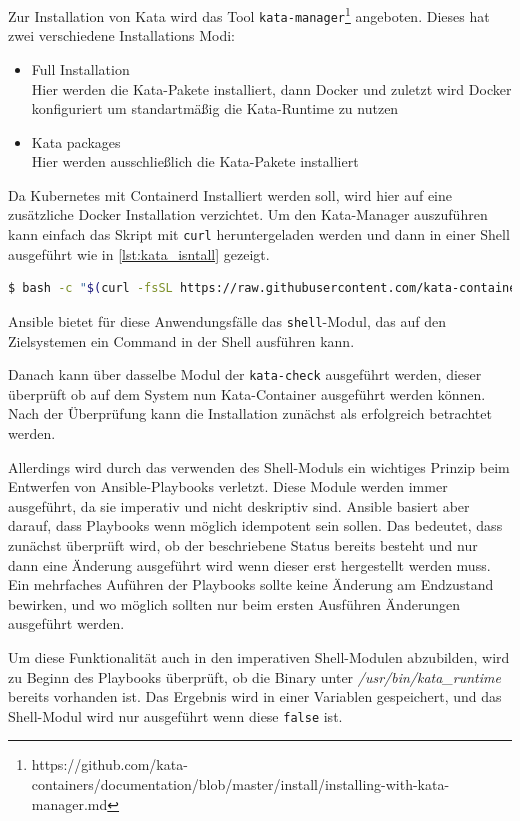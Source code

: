 Zur Installation von Kata wird das Tool \texttt{kata-manager}\footnote{https://github.com/kata-containers/documentation/blob/master/install/installing-with-kata-manager.md} angeboten. 
Dieses hat zwei verschiedene Installations Modi:
\begin{itemize}
    \item Full Installation \\ Hier werden die Kata-Pakete installiert, dann Docker und zuletzt wird Docker konfiguriert um standartmäßig die Kata-Runtime zu nutzen
    \item Kata packages \\ Hier werden ausschließlich die Kata-Pakete installiert
\end{itemize}
Da Kubernetes mit Containerd Installiert werden soll, wird hier auf eine zusätzliche Docker Installation verzichtet.
Um den Kata-Manager auszuführen kann einfach das Skript mit \texttt{curl} heruntergeladen werden und dann in einer Shell ausgeführt wie in \ref{lst:kata_isntall} gezeigt.
\begin{lstlisting}[language=bash, caption={Kata Installation}, label={lst:kata_isntall}]
$ bash -c "$(curl -fsSL https://raw.githubusercontent.com/kata-containers/tests/master/cmd/kata-manager/kata-manager.sh) install-packages"
\end{lstlisting}
Ansible bietet für diese Anwendungsfälle das \texttt{shell}-Modul, das auf den Zielsystemen ein Command in der Shell ausführen kann. 

Danach kann über dasselbe Modul der \texttt{kata-check} ausgeführt werden, dieser überprüft ob auf dem System nun Kata-Container ausgeführt werden können.
Nach der Überprüfung kann die Installation zunächst als erfolgreich betrachtet werden.

Allerdings wird durch das verwenden des Shell-Moduls ein wichtiges Prinzip beim Entwerfen von Ansible-Playbooks verletzt. 
Diese Module werden immer ausgeführt, da sie imperativ und nicht deskriptiv sind. 
Ansible basiert aber darauf, dass Playbooks wenn möglich idempotent sein sollen.
Das bedeutet, dass zunächst überprüft wird, ob der beschriebene Status bereits besteht und nur dann eine Änderung ausgeführt wird wenn dieser erst hergestellt werden muss. \cite{ansibel_idempotency}
Ein mehrfaches Auführen der Playbooks sollte keine Änderung am Endzustand bewirken, und wo möglich sollten nur beim ersten Ausführen Änderungen ausgeführt werden. 

Um diese Funktionalität auch in den imperativen Shell-Modulen abzubilden, wird zu Beginn des Playbooks überprüft, ob die Binary unter \textit{/usr/bin/kata\_runtime} bereits vorhanden ist. 
Das Ergebnis wird in einer Variablen gespeichert, und das Shell-Modul wird nur ausgeführt wenn diese \texttt{false} ist. 

